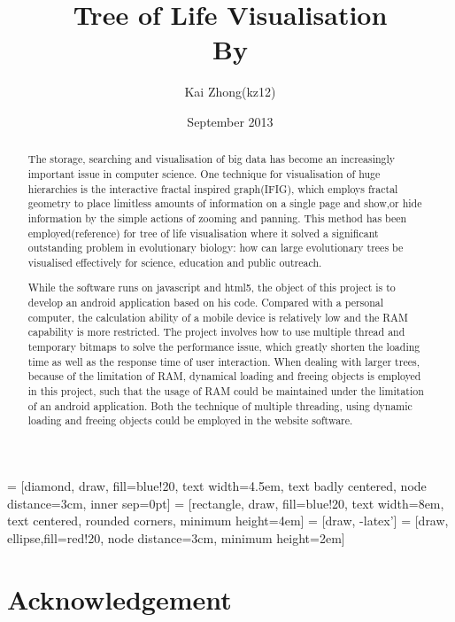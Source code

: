 \documentclass[MSc]{icldt}
\title{Tree of Life Visualisation \\ By}
\author{Kai Zhong(kz12)}
\date{September 2013}
\begin{document}
\maketitle

 = [diamond, draw, fill=blue!20, 
    text width=4.5em, text badly centered, node distance=3cm, inner sep=0pt]
 = [rectangle, draw, fill=blue!20, 
    text width=8em, text centered, rounded corners, minimum height=4em]
 = [draw, -latex']
 = [draw, ellipse,fill=red!20, node distance=3cm,
    minimum height=2em]
    
\begin{abstract}

The storage, searching and visualisation of big data has become an increasingly important issue in computer science. One technique for visualisation of huge hierarchies is the interactive fractal inspired graph(IFIG), which employs fractal geometry to place limitless amounts of information on a single page and show,or  hide information by the simple actions of zooming and panning. This method has been employed(reference) for tree of life visualisation where it solved a significant outstanding problem in evolutionary biology: how can large evolutionary trees be visualised effectively for science, education and public outreach.

While the software runs on javascript and html5, the object of this project is to develop an android application based on his code. Compared with a personal computer, the calculation ability of a mobile device is relatively low and the RAM capability is more restricted. The project involves how to use multiple thread and temporary bitmaps to solve the performance issue, which greatly shorten the loading time as well as the response time of user interaction. When dealing with larger trees, because of the limitation of RAM, dynamical loading and freeing objects is employed in this project, such that the usage of RAM could be maintained under the limitation of an android application. 
Both the technique of multiple threading, using dynamic loading and freeing objects could be employed in the website software.

\end{abstract}

\chapter*{Acknowledgement}

\makededication
\end{document}
